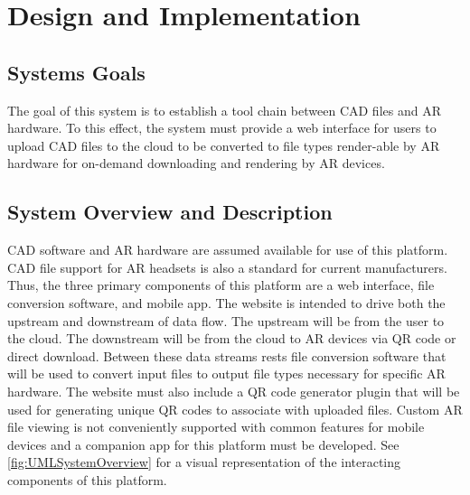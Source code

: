
\chapter{Design  and Implementation}

\section{Systems Goals}
The goal of this system is to establish a tool chain between CAD files and AR hardware. To this effect, the system must provide a web interface for users to upload CAD files to the cloud to be converted to file types render-able by AR hardware for on-demand downloading and rendering by AR devices.  

\section{System Overview and Description}
CAD software and AR hardware are assumed available for use of this platform. CAD file support for AR headsets is also a standard for current manufacturers. Thus, the three primary components of this platform are a web interface, file conversion software, and mobile app. The website is intended to drive both the upstream and downstream of data flow. The upstream will be from the user to the cloud. The downstream will be from the cloud to AR devices via QR code or direct download. Between these data streams rests file conversion software that will be used to convert input files to output file types necessary for specific AR hardware. The website must also include a QR code generator plugin that will be used for generating unique QR codes to associate with uploaded files. Custom AR file viewing is not conveniently supported with common features for mobile devices and a companion app for this platform must be developed. See \ref{fig:UMLSystemOverview} for a visual representation of the interacting components of this platform.

